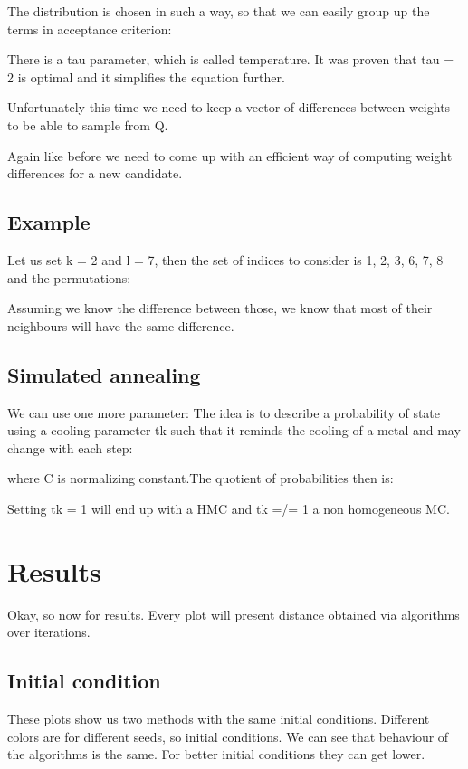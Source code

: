 \documentclass{article}
\begin{document}
			The distribution is chosen in such a way, so that we can easily group up the terms in acceptance criterion:
			
			There is a tau parameter, which is called temperature. It was proven that tau = 2 is optimal and it simplifies the equation further.
			
			Unfortunately this time we need to keep a vector of differences between weights to be able to sample from Q.
			
			Again like before we need to come up with an efficient way of computing weight differences for a new candidate.
			
		\subsection{Example}
			Let us set k = 2 and l = 7, then the set of indices to consider is {1, 2, 3, 6, 7, 8} and the permutations:
			
			Assuming we know the difference between those, we know that most of their neighbours will have the same difference.
			
		\subsection{Simulated annealing}
			We can use one more parameter: The idea is to describe a probability of state using a cooling
			parameter tk such that it reminds the cooling of a metal and may change with each step:
			
			where C is normalizing constant.The quotient of probabilities then is:
			
			Setting tk = 1 will end up with a HMC and tk =/= 1 a non homogeneous MC.
			
	\section{Results}
		Okay, so now for results. Every plot will present distance obtained via algorithms over iterations.
		
		\subsection{Initial condition}
			These plots show us two methods with the same initial conditions. Different colors are for different seeds, so initial conditions. We can see that behaviour of the algorithms is the same. For better initial conditions they can get lower.
		
\end{document}
